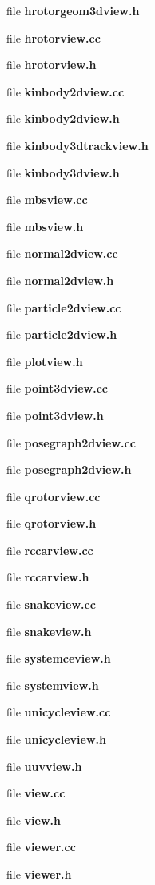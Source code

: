 \begin{DoxyCompactItemize}
\item 
file {\bf hrotorgeom3dview.\-h}
\item 
file {\bf hrotorview.\-cc}
\item 
file {\bf hrotorview.\-h}
\item 
file {\bf kinbody2dview.\-cc}
\item 
file {\bf kinbody2dview.\-h}
\item 
file {\bf kinbody3dtrackview.\-h}
\item 
file {\bf kinbody3dview.\-h}
\item 
file {\bf mbsview.\-cc}
\item 
file {\bf mbsview.\-h}
\item 
file {\bf normal2dview.\-cc}
\item 
file {\bf normal2dview.\-h}
\item 
file {\bf particle2dview.\-cc}
\item 
file {\bf particle2dview.\-h}
\item 
file {\bf plotview.\-h}
\item 
file {\bf point3dview.\-cc}
\item 
file {\bf point3dview.\-h}
\item 
file {\bf posegraph2dview.\-cc}
\item 
file {\bf posegraph2dview.\-h}
\item 
file {\bf qrotorview.\-cc}
\item 
file {\bf qrotorview.\-h}
\item 
file {\bf rccarview.\-cc}
\item 
file {\bf rccarview.\-h}
\item 
file {\bf snakeview.\-cc}
\item 
file {\bf snakeview.\-h}
\item 
file {\bf systemceview.\-h}
\item 
file {\bf systemview.\-h}
\item 
file {\bf unicycleview.\-cc}
\item 
file {\bf unicycleview.\-h}
\item 
file {\bf uuvview.\-h}
\item 
file {\bf view.\-cc}
\item 
file {\bf view.\-h}
\item 
file {\bf viewer.\-cc}
\item 
file {\bf viewer.\-h}
\end{DoxyCompactItemize}
